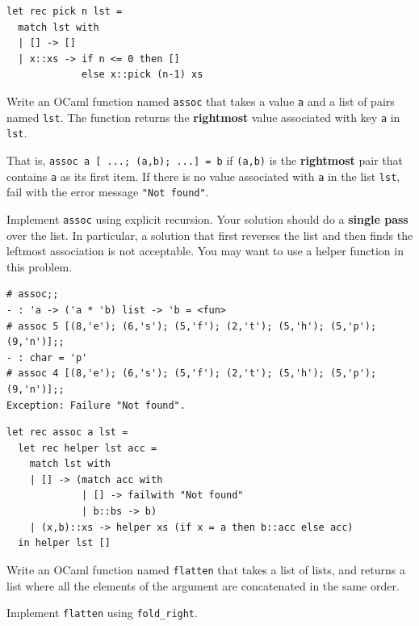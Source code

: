 \documentclass[addpoints]{exam}
\begin{document}
\begin{questions}
  \begin{solutionbox}{3.5cm}
    \begin{verbatim}
let rec pick n lst =
  match lst with
  | [] -> []
  | x::xs -> if n <= 0 then []
             else x::pick (n-1) xs
    \end{verbatim}
  \end{solutionbox}

  
  \question
  Write an OCaml function named \texttt{assoc} that takes a value \texttt{a} and
  a list of pairs named \texttt{lst}.
  The function returns the \textbf{rightmost} value associated with key \texttt{a}
  in \texttt{lst}.

  That is, \texttt{assoc a [ ...; (a,b); ...] = b} if \texttt{(a,b)} is the \textbf{rightmost}
  pair that contains \texttt{a} as its first item.
  If there is no value associated with \texttt{a} in the list \texttt{lst},
  fail with the error message \texttt{"Not found"}.

  Implement \texttt{assoc} using explicit recursion.
  Your solution should do a \textbf{single pass} over the list.
  In particular, a solution that first reverses the list
  and then finds the leftmost association is not acceptable.
  You may want to use a helper function in this problem.
  
  \begin{verbatim}
# assoc;;
- : 'a -> ('a * 'b) list -> 'b = <fun>
# assoc 5 [(8,'e'); (6,'s'); (5,'f'); (2,'t'); (5,'h'); (5,'p'); (9,'n')];;
- : char = 'p'
# assoc 4 [(8,'e'); (6,'s'); (5,'f'); (2,'t'); (5,'h'); (5,'p'); (9,'n')];;
Exception: Failure "Not found".
  \end{verbatim}

  \begin{solutionbox}{5cm}
    \begin{verbatim}
let rec assoc a lst =
  let rec helper lst acc =
    match lst with
    | [] -> (match acc with
             | [] -> failwith "Not found"
             | b::bs -> b)
    | (x,b)::xs -> helper xs (if x = a then b::acc else acc)
  in helper lst []
    \end{verbatim}
  \end{solutionbox}

  
  \question
  Write an OCaml function named \texttt{flatten} that takes a list of lists,
  and returns a list where all the elements of the argument
  are concatenated in the same order.

  Implement \texttt{flatten} using \texttt{fold\_right}. 


\end{questions}
\end{document}
